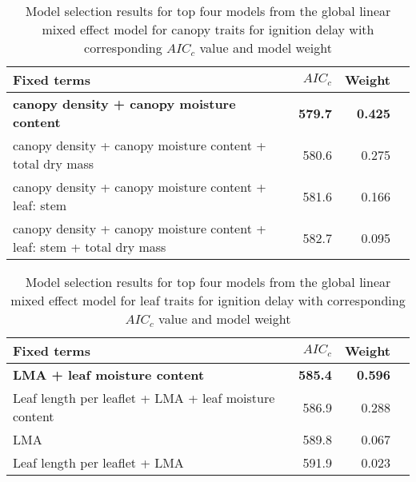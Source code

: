\documentclass[12pt]{report}
\begin{document}


\begin{table}
\centering
\caption{Model selection results for top four models from the global linear mixed effect model for canopy traits for ignition delay with corresponding $AIC_{c}$ value and model weight}
\vspace{0.5 cm}
\begin{tabular}{lrrr} 
\hline
\textbf{Fixed terms} & $AIC_{c}$ & \textbf{Weight}\\
\hline
\textbf{canopy density + canopy moisture content}    & \textbf{579.7} & \textbf{0.425} \\
canopy density + canopy moisture content + total dry mass   & 580.6   & 0.275 \\
canopy density + canopy moisture content + leaf: stem       & 581.6   & 0.166  \\
canopy density + canopy moisture content + leaf: stem + total dry mass & 582.7  & 0.095 \\  
\end{tabular}
\label{tab:canopy_models_ignition_delay}
\end{table}


\begin{table}
\centering
\caption{Model selection results for top four models from the global linear mixed effect model for leaf traits for ignition delay with corresponding $AIC_{c}$ value and model weight}
\vspace{0.5 cm}
\begin{tabular}{lrrr}
\hline
\textbf{Fixed terms} & $AIC_{c}$ & \textbf{Weight}\\
\hline
\textbf{LMA + leaf moisture content}    & \textbf{585.4} & \textbf{0.596} \\
Leaf length per leaflet + LMA + leaf moisture content & 586.9          & 0.288          \\
LMA                                                   & 589.8          & 0.067          \\
Leaf length per leaflet + LMA                         & 591.9          & 0.023          \\           
\end{tabular}
\label{tab:leaf_models_ignition_delay}
\end{table}



\end{document}
